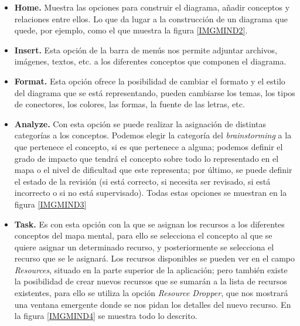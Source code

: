\documentclass[11pt,a4paper,spanish,twoside]{report}
\begin{document}
        \begin{itemize}
          \item \textbf{Home.} Muestra las opciones para construir el
            diagrama, añadir conceptos y relaciones entre ellos. Lo que da
            lugar a la construcción de un diagrama que quede, por ejemplo,
            como el que muestra la figura \ref{IMGMIND2}.


          \item \textbf{Insert.} Esta opción de la barra de menús nos permite
            adjuntar archivos, imágenes, textos, etc. a los diferentes
            conceptos que componen el diagrama. 

          \item \textbf{Format.} Esta opción ofrece la posibilidad de cambiar
            el formato y el estilo del diagrama que se está representando,
            pueden cambiarse los temas, los tipos de conectores, los colores,
            las formas, la fuente de las letras, etc.

          \item \textbf{Analyze.} Con esta opción se puede realizar la
            asignación de distintas categorías a los conceptos. Podemos
            elegir la categoría del \emph{brainstorming} a la que pertenece
            el concepto, si es que pertenece a alguna; podemos definir el
            grado de impacto que tendrá el concepto sobre todo lo
            representado en el mapa o el nivel de dificultad que este
            representa; por último, se puede definir el estado de la revisión
            (si está correcto, si necesita ser revisado, si está incorrecto o
            si no está supervisado). Todas estas opciones se muestran en la
            figura \ref{IMGMIND3}


          \item \textbf{Task.} Es con esta opción con la que se asignan los
            recursos a los diferentes conceptos del mapa mental, para ello se
            selecciona el concepto al que se quiere asignar un determinado
            recurso, y posteriormente se selecciona el recurso que se le
            asignará. Los recursos disponibles se pueden ver en el campo
            \emph{Resources}, situado en la parte superior de la aplicación;
            pero también existe la posibilidad de crear nuevos recursos que
            se sumarán a la lista de recursos existentes, para ello se
            utiliza la opción \emph{Resource Dropper}, que nos mostrará una
            ventana emergente donde se nos pidan los detalles del nuevo
            recurso. En la figura \ref{IMGMIND4} se muestra todo lo
            descrito.


\end{itemize}
\end{document}
